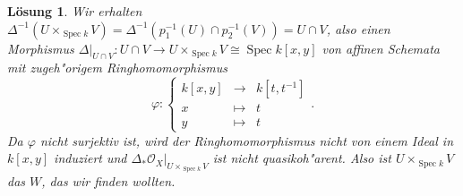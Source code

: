 \documentclass[paper = A4, fontsize=12pt, numbers=noendperiod, chapterprefix=true]{scrbook}
\theoremstyle{break}
\newtheorem{Loes}{L\"osung}
\theoremstyle{nonumberbreak}
\theoremstyle{nonumberplain}
\DeclareMathOperator{\Spec}{Spec}
\newcommand{\calO}{\mathcal{O}}
\begin{document}
\begin{Loes}
Wir erhalten $\Delta^{-1}(U \times_{\Spec k} V) = \Delta^{-1}(p_1^{-1}(U) \cap p_2^{-1}(V)) = U \cap V$, also einen Morphismus  $\Delta|_{U \cap V} \colon U \cap V \to U \times_{\Spec k} V \cong \Spec k[x,y]$ von affinen Schemata mit zugeh"origem Ringhomomorphismus 
$$\varphi: \left\{\begin{array}{rcl}
                  k[x,y] & \to& k[t,t^{-1}] \\ x &\mapsto& t \\ y &\mapsto& t                                                                                                                                                                                                                                                                                                                                                                                                                                                                                                            \end{array} \right. .$$
Da $\varphi$ nicht surjektiv ist, wird der Ringhomomorphismus nicht von einem Ideal in $k[x,y]$ induziert und $\Delta_\ast \calO_X|_{U \times_{\Spec k} V}$ ist nicht quasikoh"arent. Also ist $U \times_{\Spec k} V$ das $W$, das wir finden wollten.
\end{Loes}
\end{document}
